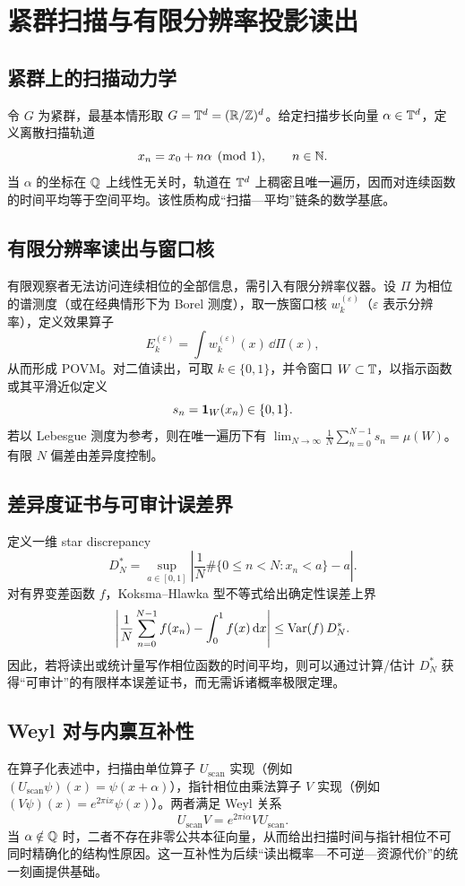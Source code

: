 \section{紧群扫描与有限分辨率投影读出}

\subsection{紧群上的扫描动力学}

令 $G$ 为紧群，最基本情形取 $G=\mathbb{T}^d=(\mathbb{R}/\mathbb{Z})^d$。给定扫描步长向量 $\alpha\in\mathbb{T}^d$，定义离散扫描轨道
\[
x_n = x_0 + n\alpha \pmod{1},\qquad n\in\mathbb{N}.
\]
当 $\alpha$ 的坐标在 $\mathbb{Q}$ 上线性无关时，轨道在 $\mathbb{T}^d$ 上稠密且唯一遍历，因而对连续函数的时间平均等于空间平均。该性质构成“扫描—平均”链条的数学基底。

\subsection{有限分辨率读出与窗口核}

有限观察者无法访问连续相位的全部信息，需引入有限分辨率仪器。设 $\Pi$ 为相位的谱测度（或在经典情形下为 Borel 测度），取一族窗口核 $w_k^{(\varepsilon)}$（$\varepsilon$ 表示分辨率），定义效果算子
\[
E_k^{(\varepsilon)}=\int w_k^{(\varepsilon)}(x)\,\dd\Pi(x),
\]
从而形成 POVM。对二值读出，可取 $k\in\{0,1\}$，并令窗口 $W\subset \mathbb{T}$，以指示函数或其平滑近似定义
\[
s_n = \mathbf{1}_W(x_n)\in\{0,1\}.
\]
若以 Lebesgue 测度为参考，则在唯一遍历下有 $\lim_{N\to\infty}\frac1N\sum_{n=0}^{N-1}s_n=\mu(W)$。有限 $N$ 偏差由差异度控制。

\subsection{差异度证书与可审计误差界}

定义一维 star discrepancy
\[
D_N^*=\sup_{a\in[0,1]}\left|\frac1N\#\{0\le n<N:x_n<a\}-a\right|.
\]
对有界变差函数 $f$，Koksma--Hlawka 型不等式给出确定性误差上界
\[
\left|\frac1N\sum_{n=0}^{N-1}f(x_n)-\int_0^1 f(x)\,\mathrm{d} x\right|\le \mathrm{Var}(f)\,D_N^*.
\]
因此，若将读出或统计量写作相位函数的时间平均，则可以通过计算/估计 $D_N^*$ 获得“可审计”的有限样本误差证书，而无需诉诸概率极限定理。

\subsection{Weyl 对与内禀互补性}

在算子化表述中，扫描由单位算子 $U_{\mathrm{scan}}$ 实现（例如 $(U_{\mathrm{scan}}\psi)(x)=\psi(x+\alpha)$），指针相位由乘法算子 $V$ 实现（例如 $(V\psi)(x)=e^{2\pi i x}\psi(x)$）。两者满足 Weyl 关系
\[
U_{\mathrm{scan}}V=e^{2\pi i\alpha}VU_{\mathrm{scan}}.
\]
当 $\alpha\notin\mathbb{Q}$ 时，二者不存在非零公共本征向量，从而给出扫描时间与指针相位不可同时精确化的结构性原因。这一互补性为后续“读出概率—不可逆—资源代价”的统一刻画提供基础。

